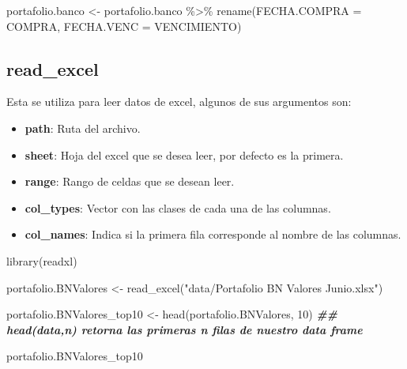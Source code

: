 \documentclass[
  12pt,
]{book}
\newenvironment{Shaded}{\begin{snugshade}}{\end{snugshade}}
\newcommand{\AttributeTok}[1]{\textcolor[rgb]{0.77,0.63,0.00}{#1}}
\newcommand{\DecValTok}[1]{\textcolor[rgb]{0.00,0.00,0.81}{#1}}
\newcommand{\DocumentationTok}[1]{\textcolor[rgb]{0.56,0.35,0.01}{\textbf{\textit{#1}}}}
\newcommand{\FunctionTok}[1]{\textcolor[rgb]{0.00,0.00,0.00}{#1}}
\newcommand{\NormalTok}[1]{#1}
\newcommand{\OtherTok}[1]{\textcolor[rgb]{0.56,0.35,0.01}{#1}}
\newcommand{\SpecialCharTok}[1]{\textcolor[rgb]{0.00,0.00,0.00}{#1}}
\newcommand{\StringTok}[1]{\textcolor[rgb]{0.31,0.60,0.02}{#1}}
\providecommand{\tightlist}{%
  \setlength{\itemsep}{0pt}\setlength{\parskip}{0pt}}
\begin{document}
\begin{Shaded}
\begin{Highlighting}[]
\NormalTok{portafolio.banco }\OtherTok{\textless{}{-}}\NormalTok{ portafolio.banco }\SpecialCharTok{\%\textgreater{}\%} \FunctionTok{rename}\NormalTok{(}\AttributeTok{FECHA.COMPRA =}\NormalTok{ COMPRA, }\AttributeTok{FECHA.VENC =}\NormalTok{ VENCIMIENTO)}
\end{Highlighting}
\end{Shaded}

\hypertarget{read_excel}{%
\subsection{\texorpdfstring{\textbf{read\_excel}}{read\_excel}}\label{read_excel}}

Esta se utiliza para leer datos de excel, algunos de sus argumentos son:

\begin{itemize}
\tightlist
\item
  \textbf{path}: Ruta del archivo.
\item
  \textbf{sheet}: Hoja del excel que se desea leer, por defecto es la primera.
\item
  \textbf{range}: Rango de celdas que se desean leer.
\item
  \textbf{col\_types}: Vector con las clases de cada una de las columnas.
\item
  \textbf{col\_names}: Indica si la primera fila corresponde al nombre de las columnas.
\end{itemize}

\begin{Shaded}
\begin{Highlighting}[]
\FunctionTok{library}\NormalTok{(readxl)}


\NormalTok{portafolio.BNValores }\OtherTok{\textless{}{-}} \FunctionTok{read\_excel}\NormalTok{(}\StringTok{"data/Portafolio BN Valores Junio.xlsx"}\NormalTok{)}

\NormalTok{portafolio.BNValores\_top10 }\OtherTok{\textless{}{-}} \FunctionTok{head}\NormalTok{(portafolio.BNValores, }\DecValTok{10}\NormalTok{) }\DocumentationTok{\#\# head(data,n) retorna las primeras n filas de nuestro data frame}

\NormalTok{portafolio.BNValores\_top10}
\end{Highlighting}
\end{Shaded}
\end{document}
